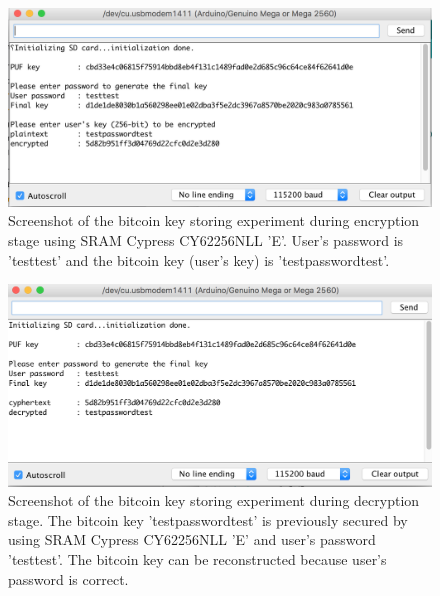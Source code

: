 \begin{figure}[tph!]
    \centerline{\includegraphics[width={\textwidth}]{images/E_encrypt}}
    \caption{Screenshot of the bitcoin key storing experiment during encryption stage using SRAM Cypress CY62256NLL 'E'.
    User's password is 'testtest' and the bitcoin key (user's key) is 'testpasswordtest'.}
    \label{fig:E_encrypt}
\end{figure}

\begin{figure}[tph!]
    \centerline{\includegraphics[width={\textwidth}]{images/E_decrypt_correct}}
    \caption{Screenshot of the bitcoin key storing experiment during decryption stage. The bitcoin key 'testpasswordtest' is previously secured by using SRAM Cypress CY62256NLL 'E' and user's password 'testtest'.
    The bitcoin key can be reconstructed because user's password is correct.}
    \label{fig:E_decrypt_correct}
\end{figure}


